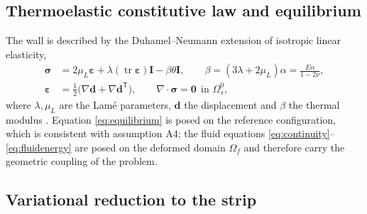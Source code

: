 \documentclass[11pt,a4paper]{article}
\newcommand{\bd}{\mathbf d}
\newcommand{\bI}{\mathbf I}
\newcommand{\beps}{\boldsymbol\varepsilon}
\newcommand{\bsig}{\boldsymbol\sigma}
\newcommand{\Om}{\Omega}
\begin{document}
\subsection{Thermoelastic constitutive law and equilibrium}
\label{sec:constitutive}

The wall is described by the Duhamel--Neumann extension of isotropic linear
elasticity,
\begin{align}
\bsig &= 2\mu_L\beps + \lambda(\operatorname{tr}\beps)\bI - \beta\theta\bI,
\qquad \beta=(3\lambda+2\mu_L)\alpha=\frac{E\alpha}{1-2\nu},
\label{eq:constitutive}\\
\beps &= \tfrac12\bigl(\nabla\bd+\nabla\bd^{\mathsf T}\bigr),
\qquad \nabla\cdot\bsig=\mathbf 0 \ \ \text{in } \Om_s^0,
\label{eq:equilibrium}
\end{align}
where $\lambda,\mu_L$ are the Lam\'e parameters, $\bd$ the displacement and
$\beta$ the thermal modulus \citep{boley1960theory,timoshenko1970elasticity}.
Equation \eqref{eq:equilibrium} is posed on the reference configuration,
which is consistent with assumption A4; the fluid equations
\eqref{eq:continuity}--\eqref{eq:fluidenergy} are posed on the deformed domain
$\Om_f$ and therefore carry the geometric coupling of the problem.

\subsection{Variational reduction to the strip}
\label{sec:variational}
\end{document}
